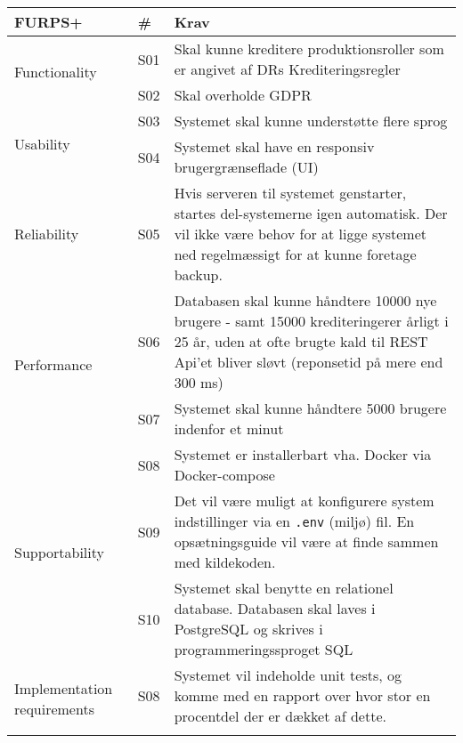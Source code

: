 \begin{center}
    \begin{longtable}[h]{|p{4cm}|p{1cm}|p{11cm}|}
        \hline
        \textbf{FURPS+}                     & \textbf{\#}   & \textbf{Krav} \\ 
        \hline
        \multirow{2}{0}{Functionality}      & S01           & Skal kunne kreditere produktionsroller som er angivet af DRs Krediteringsregler  \\ \cline{2-3} 
                                            & S02           & Skal overholde GDPR \\ \hline
        \multirow{2}{0}{Usability}          & S03           & Systemet skal kunne understøtte flere sprog \\ \cline{2-3}
                                            & S04           & Systemet skal have en responsiv brugergrænseflade (UI) \\ \hline
        Reliability                         & S05           & Hvis serveren til systemet genstarter, startes del-systemerne igen automatisk. Der vil ikke være behov for at ligge systemet ned regelmæssigt for at kunne foretage backup. \\ \hline
        \multirow{2}{0}{Performance}       & S06           & Databasen skal kunne håndtere 10000 nye brugere - samt 15000 krediteringerer årligt i 25 år, uden at ofte brugte kald til REST Api'et bliver sløvt (reponsetid på mere end 300 ms) \\ \cline{2-3}
                                            & S07           & Systemet skal kunne håndtere 5000 brugere indenfor et minut\\ \hline
        \multirow{3}{0}{Supportability}     & S08           & Systemet er installerbart vha. Docker via Docker-compose\\ \cline{2-3}
                                            & S09           & Det vil være muligt at konfigurere system indstillinger via en \texttt{.env} (miljø) fil. En opsætningsguide vil være at finde sammen med kildekoden. \\ \hline
        Design constraints                  & S10           & Systemet skal benytte en relationel database. Databasen skal laves i PostgreSQL og skrives i programmeringssproget SQL\\ \hline
        \multirow{3}{0}{Implementation requirements}   & S08   & Systemet vil indeholde unit tests, og komme med en rapport over hvor stor en procentdel der er dækket af dette.\\ \cline{2-3}

\end{longtable}
\end{center}
